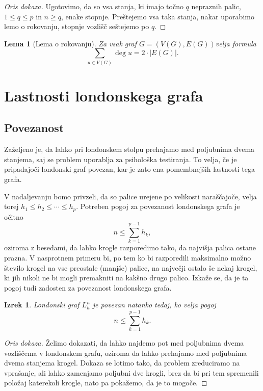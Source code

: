 \documentclass[11pt,a4paper]{article}
\theoremstyle{definition} %
\theoremstyle{plain} %
\newtheorem{lema}[definicija]{Lema}
\newtheorem{izrek}[definicija]{Izrek}
\newcommand{\graf}[1][G]{\ensuremath{#1 = (V(#1), E(#1))}}
\DeclareMathOperator {\stopnja} {deg}
\begin{document}
\begin{proof}[Oris dokaza]
    Ugotovimo, da so vsa stanja, ki imajo točno $q$ nepraznih palic, $1 \leq q \leq p$ in $n \geq q$, enake stopnje. Preštejemo vsa taka stanja, nakar uporabimo lemo o rokovanju, stopnje vozlišč seštejemo po $q$.
\end{proof}

\begin{lema}[Lema o rokovanju]
    \label{lema:rokovanje}
    Za vsak graf \graf velja formula
    \begin{equation}
    \sum_{u \in V(G)}\! \stopnja u = 2 \cdot |E(G)|.
    \label{eq:lema-o-rokovanju}
    \end{equation}
\end{lema}

\section{Lastnosti londonskega grafa}

\subsection{Povezanost}
Zaželjeno je, da lahko pri londonskem stolpu prehajamo med poljubnima dvema stanjema, saj se problem uporablja za psihološka testiranja. To velja, če je pripadajoči londonski graf povezan, kar je zato ena pomembnejših lastnosti tega grafa.

V nadaljevanju bomo privzeli, da so palice urejene po velikosti naraščajoče, velja torej $h_1 \leq h_2 \leq \cdots \leq h_p$.
Potreben pogoj za povezanost londonskega grafa je očitno 
\[ n \leq \sum_{k=1}^{p-1} h_k, \]
oziroma z besedami, da lahko krogle razporedimo tako, da najvišja palica ostane prazna. V nasprotnem primeru bi, po tem ko bi razporedili maksimalno možno število krogel na vse preostale (manjše) palice, na največji ostalo še nekaj krogel, ki jih nikoli ne bi mogli premakniti na kakšno drugo palico.
Izkaže se, da je ta pogoj tudi zadosten za povezanost londonskega grafa.

\begin{izrek}
    Londonski graf $L_h^n$ je povezan natanko tedaj, ko velja pogoj
    \begin{equation}
        n \leq \sum_{k=1}^{p-1} h_k.
        \label{eq:pogoj-povezanosti}
    \end{equation}
\end{izrek}

\begin{proof}[Oris dokaza]
    Želimo dokazati, da lahko najdemo pot med poljubnima dvema vozliščema v londonskem grafu, oziroma da lahko prehajamo med poljubnima dvema stanjema krogel. Dokaza se lotimo tako, da problem zreduciramo na vprašanje, ali lahko zamenjamo poljubni dve krogli, brez da bi pri tem spremenili položaj katerekoli krogle, nato pa pokažemo, da je to mogoče.
\end{proof}
\end{document}
